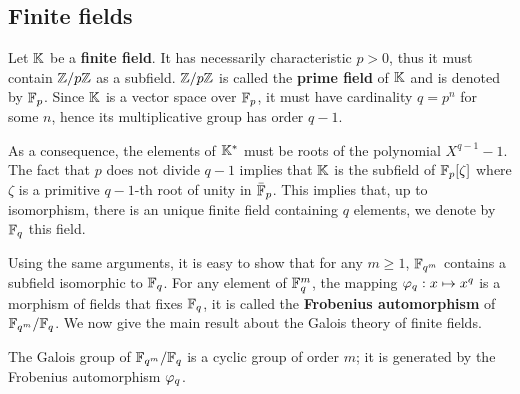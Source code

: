 \subsection{Finite fields}
\label{sec:basic-galois-theory:finite-fields}

Let $\mathbb{K}$ be a   \textbf{finite
  field}. It has necessarily characteristic $p>0$, thus it must
contain $\mathbb{Z}/p\mathbb{Z}$ as a subfield. $\mathbb{Z}/p\mathbb{Z}$ is called the
 \textbf{prime field} of $\mathbb{K}$
and is denoted by $\mathbb{F}_p$. Since $\mathbb{K}$ is a vector space over $\mathbb{F}_p$, it
must have cardinality $q=p^n$ for some $n$, hence its multiplicative
group has order $q-1$.

As a consequence, the elements of $\mathbb{K}^\ast$ must be roots of the
polynomial $X^{q-1}-1$. The fact that $p$ does not divide $q-1$
implies that $\mathbb{K}$ is the subfield of $\mathbb{F}_p[\zeta]$ where $\zeta$ is a
primitive $q-1$-th root of unity in $\bar{\mathbb{F}}_p$. This implies that,
up to isomorphism, there is an unique finite field containing $q$
elements, we denote by $\mathbb{F}_q$ this field.

Using the same arguments, it is easy to show that for any $m\ge 1$,
$\mathbb{F}_{q^m}$ contains a subfield isomorphic to $\mathbb{F}_q$.  For any element
of $\mathbb{F}_q^m$, the mapping $\varphi_q:x\mapsto x^q$ is a morphism of
fields that fixes $\mathbb{F}_q$, it is called the
\textbf{Frobenius automorphism} of
$\mathbb{F}_{q^m}/\mathbb{F}_q$. We now give the main result about the Galois theory
of finite fields.

\begin{proposition}
  The Galois group of $\mathbb{F}_{q^m}/\mathbb{F}_q$ is a cyclic group of order $m$;
  it is generated by the Frobenius automorphism $\varphi_q$.
\end{proposition}





